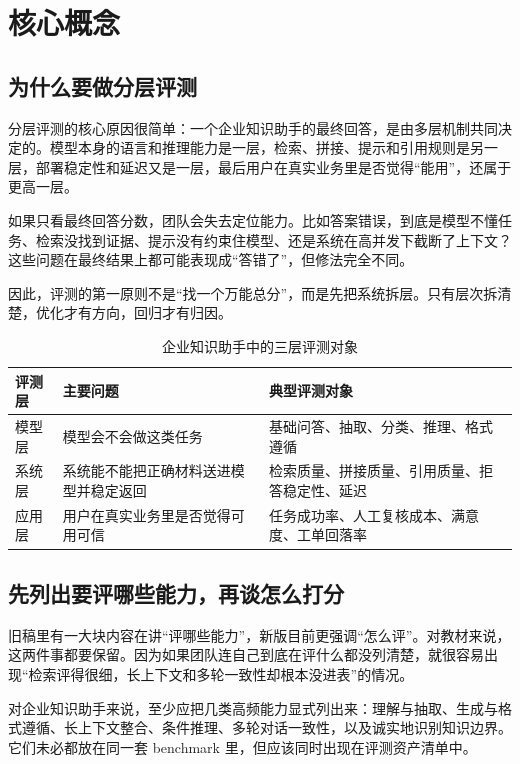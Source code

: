 \section{核心概念}
\subsection{为什么要做分层评测}
分层评测的核心原因很简单：一个企业知识助手的最终回答，是由多层机制共同决定的。模型本身的语言和推理能力是一层，检索、拼接、提示和引用规则是另一层，部署稳定性和延迟又是一层，最后用户在真实业务里是否觉得“能用”，还属于更高一层。

如果只看最终回答分数，团队会失去定位能力。比如答案错误，到底是模型不懂任务、检索没找到证据、提示没有约束住模型、还是系统在高并发下截断了上下文？这些问题在最终结果上都可能表现成“答错了”，但修法完全不同。

因此，评测的第一原则不是“找一个万能总分”，而是先把系统拆层。只有层次拆清楚，优化才有方向，回归才有归因。

\begin{table}[H]
\centering
\small
\begin{tabularx}{\textwidth}{>{\raggedright\arraybackslash}p{2.7cm}>{\raggedright\arraybackslash}p{3.2cm}>{\raggedright\arraybackslash}X}
\toprule
\textbf{评测层} & \textbf{主要问题} & \textbf{典型评测对象} \\
\midrule
模型层 & 模型会不会做这类任务 & 基础问答、抽取、分类、推理、格式遵循 \\
系统层 & 系统能不能把正确材料送进模型并稳定返回 & 检索质量、拼接质量、引用质量、拒答稳定性、延迟 \\
应用层 & 用户在真实业务里是否觉得可用可信 & 任务成功率、人工复核成本、满意度、工单回落率 \\
\bottomrule
\end{tabularx}
\caption{企业知识助手中的三层评测对象}
\label{tab:eval-three-layers}
\end{table}

\subsection{先列出要评哪些能力，再谈怎么打分}
旧稿里有一大块内容在讲“评哪些能力”，新版目前更强调“怎么评”。对教材来说，这两件事都要保留。因为如果团队连自己到底在评什么都没列清楚，就很容易出现“检索评得很细，长上下文和多轮一致性却根本没进表”的情况。

对企业知识助手来说，至少应把几类高频能力显式列出来：理解与抽取、生成与格式遵循、长上下文整合、条件推理、多轮对话一致性，以及诚实地识别知识边界。它们未必都放在同一套 benchmark 里，但应该同时出现在评测资产清单中。

